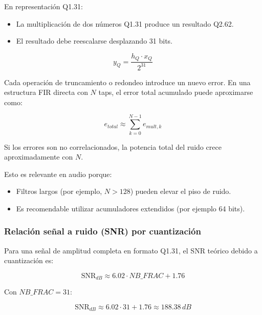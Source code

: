 \documentclass[a4,11pt]{article}
\begin{document}
En representación Q1.31:

\begin{itemize}
\item La multiplicación de dos números Q1.31 produce un resultado Q2.62.
\item El resultado debe reescalarse desplazando 31 bits.
\end{itemize}

\begin{equation}
\label{eq:reescalado}
y_Q = \frac{h_Q \cdot x_Q}{2^{31}}
\end{equation}

Cada operación de truncamiento o redondeo introduce un nuevo error. En una estructura FIR directa con $N$ taps, el error total acumulado puede aproximarse como:

\begin{equation}
\label{eq:error_total}
e_{total} \approx \sum_{k=0}^{N-1} e_{mult,k}
\end{equation}

Si los errores son no correlacionados, la potencia total del ruido crece aproximadamente con $N$.

Esto es relevante en audio porque:

\begin{itemize}
\item Filtros largos (por ejemplo, $N > 128$) pueden elevar el piso de ruido.
\item Es recomendable utilizar acumuladores extendidos (por ejemplo 64 bits).
\end{itemize}

\subsubsection{Relación señal a ruido (SNR) por cuantización}
\label{subsubsec:snr_cuantizacion}

Para una señal de amplitud completa en formato Q1.31, el SNR teórico debido a cuantización es:

\begin{equation}
\label{eq:snr}
\text{SNR}_{dB} \approx 6.02 \cdot NB\_FRAC + 1.76
\end{equation}

Con $NB\_FRAC = 31$:

\begin{equation}
\label{eq:snr_q31}
\text{SNR}_{dB} \approx 6.02 \cdot 31 + 1.76 \approx 188.38 \, dB
\end{equation}
\end{document}
